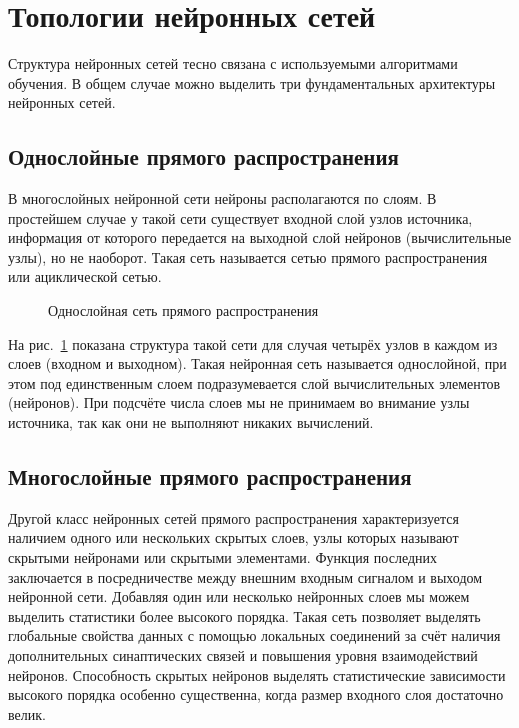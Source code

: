 \section{Топологии нейронных сетей}

Структура нейронных сетей тесно связана с используемыми алгоритмами обучения.
В общем случае можно выделить три фундаментальных архитектуры нейронных сетей.

\subsection{Однослойные прямого распространения}

В многослойных нейронной сети нейроны располагаются по слоям.
В простейшем случае у такой сети существует входной слой узлов источника, информация от которого передается на выходной слой нейронов (вычислительные узлы), но не наоборот. 
Такая сеть называется сетью прямого распространения или ациклической сетью.
\begin{figure}[h]
\caption{Однослойная сеть прямого распространения}
\label{ris:OneLayer}
\end{figure}

На рис.~\ref{ris:OneLayer} показана структура такой сети для случая четырёх узлов в каждом из слоев (входном и выходном).
Такая нейронная сеть называется однослойной, при этом под единственным слоем подразумевается слой вычислительных элементов (нейронов).
При подсчёте числа слоев мы не принимаем во внимание узлы источника, так как они не выполняют никаких вычислений.\cite{NejronnyeSeti}

\subsection{Многослойные прямого распространения}

Другой класс нейронных сетей прямого распространения  характеризуется наличием одного или нескольких скрытых слоев, узлы которых называют скрытыми нейронами или скрытыми элементами.
Функция последних заключается в посредничестве между внешним входным сигналом и выходом нейронной сети.
Добавляя один или несколько нейронных слоев мы можем выделить статистики более высокого порядка.
Такая сеть позволяет выделять глобальные свойства данных с помощью локальных соединений за счёт наличия дополнительных синаптических связей  и повышения уровня взаимодействий нейронов.
Способность скрытых нейронов выделять статистические зависимости высокого порядка особенно существенна, когда размер входного слоя достаточно велик.

